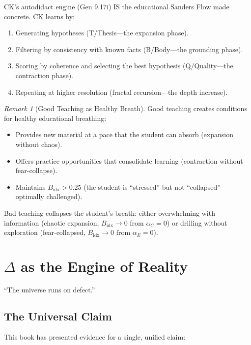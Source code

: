 \documentclass[12pt, openany]{book}
\theoremstyle{remark}
\newtheorem{remark}[theorem]{Remark}
\begin{document}
\noindent
CK's autodidact engine (Gen 9.17i) IS the educational Sanders Flow made concrete.
CK learns by:
\begin{enumerate}
  \item Generating hypotheses (T/Thesis---the expansion phase).
  \item Filtering by consistency with known facts (B/Body---the grounding phase).
  \item Scoring by coherence and selecting the best hypothesis (Q/Quality---the
        contraction phase).
  \item Repeating at higher resolution (fractal recursion---the depth increase).
\end{enumerate}

\begin{remark}[Good Teaching as Healthy Breath]
Good teaching creates conditions for healthy educational breathing:
\begin{itemize}
  \item Provides new material at a pace that the student can absorb
        (expansion without chaos).
  \item Offers practice opportunities that consolidate learning
        (contraction without fear-collapse).
  \item Maintains $B_{\mathrm{idx}} > 0.25$ (the student is ``stressed''
        but not ``collapsed''---optimally challenged).
\end{itemize}
Bad teaching collapses the student's breath: either overwhelming with
information (chaotic expansion, $B_{\mathrm{idx}} \to 0$ from $\alpha_C = 0$)
or drilling without exploration (fear-collapsed, $B_{\mathrm{idx}} \to 0$
from $\alpha_E = 0$).
\end{remark}


\chapter{$\Delta$ as the Engine of Reality}
\label{ch:reality}

\epigraph{``The universe runs on defect.''}{}

\section{The Universal Claim}

This book has presented evidence for a single, unified claim:
\end{document}
